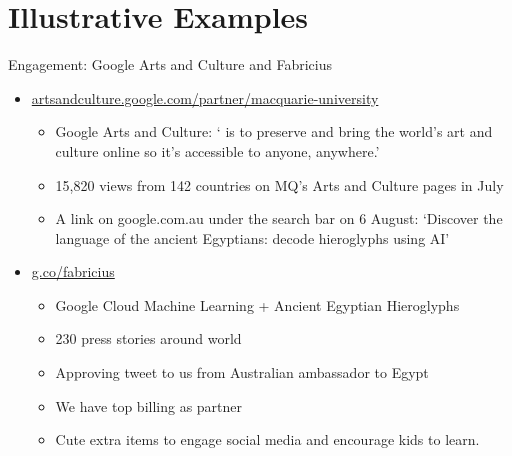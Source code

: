 \documentclass[aspectratio=1610, 11pt]{beamer} %
\begin{document}
\section{Illustrative Examples}
{%
\begin{frame}{Engagement: Google Arts and Culture and Fabricius}

\begin{itemize}
    \item \url{artsandculture.google.com/partner/macquarie-university}
    \begin{itemize}
    \item Google Arts and Culture: ` is to preserve and bring the world’s art and culture online so it’s accessible to anyone, anywhere.' \parencite{Google_Arts_and_Culture2020-ga}
    \item 15,820 views from 142 countries on MQ's Arts and Culture pages in July
    \item A link on google.com.au under the search bar on 6 August: `Discover the language of the ancient Egyptians: decode hieroglyphs using AI'
    \end{itemize}
    \item \url{g.co/fabricius}
    \begin{itemize}
    \item Google Cloud Machine Learning + Ancient Egyptian Hieroglyphs
    \item 230 press stories around world
    \item Approving tweet to us from Australian ambassador to Egypt
    \item We have top billing as partner
    \item Cute extra items to engage social media and encourage kids to learn.
    \end{itemize}
\end{itemize}

\end{frame}}
\end{document}
